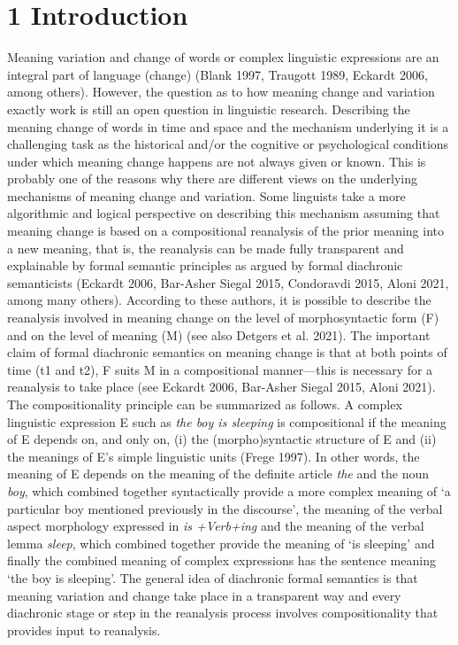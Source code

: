 \clearpage\clearpage\setcounter{page}{1}\section[1 Introduction]{1 Introduction}
\begin{styleStandard}
Meaning variation and change of words or complex linguistic expressions are an integral part of language (change) (Blank 1997, Traugott 1989, Eckardt 2006, among others). However, the question as to how meaning change and variation exactly work is still an open question in linguistic research. Describing the meaning change of words in time and space and the mechanism underlying it is a challenging task as the historical and/or the cognitive or psychological conditions under which meaning change happens are not always given or known. This is probably one of the reasons why there are different views on the underlying mechanisms of meaning change and variation. Some linguists take a more algorithmic and logical perspective on describing this mechanism assuming that meaning change is based on a compositional reanalysis of the prior meaning into a new meaning, that is, the reanalysis can be made fully transparent and explainable by formal semantic principles as argued by formal diachronic semanticists (Eckardt 2006, Bar-Asher Siegal 2015, Condoravdi 2015, Aloni 2021, among many others). According to these authors, it is possible to describe the reanalysis involved in meaning change on the level of morphosyntactic form (F) and on the level of meaning (M) (see also Detgers et al. 2021). The important claim of formal diachronic semantics on meaning change is that at both points of time (t1 and t2), F suits M in a compositional manner—this is necessary for a reanalysis to take place (see Eckardt 2006, Bar-Asher Siegal 2015, Aloni 2021). The compositionality principle can be summarized as follows. A complex linguistic expression E such as \textit{the boy is sleeping} is compositional if the meaning of E depends on, and only on, (i) the (morpho)syntactic structure of E and (ii) the meanings of E’s simple linguistic units (Frege 1997). In other words, the meaning of E depends on the meaning of the definite article \textit{the} and the noun \textit{boy}, which combined together syntactically provide a more complex meaning of ‘a particular boy mentioned previously in the discourse’, the meaning of the verbal aspect morphology expressed in \textit{is +Verb+ing} and the meaning of the verbal lemma \textit{sleep}, which combined together provide the meaning of ‘is sleeping’ and finally the combined meaning of complex expressions has the sentence meaning ‘the boy is sleeping’. The general idea of diachronic formal semantics is that meaning variation and change take place in a transparent way and every diachronic stage or step in the reanalysis process involves compositionality that provides input to reanalysis.
\end{styleStandard}

